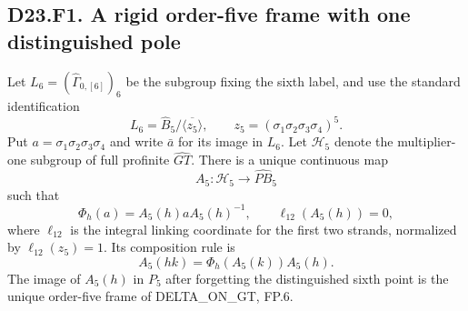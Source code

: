 
\subsection*{D23.F1. A rigid order-five frame with one distinguished pole}
Let $L_6=(\widehat\Gamma_{0,[6]})_6$ be the subgroup fixing the
sixth label, and use the standard identification
\[
 L_6=\widehat B_5/\overline{\langle z_5\rangle},\qquad
 z_5=(\sigma_1\sigma_2\sigma_3\sigma_4)^5.
\]
Put $a=\sigma_1\sigma_2\sigma_3\sigma_4$ and write $\bar a$
for its image in $L_6$.  Let $\mathcal H_5$ denote the
multiplier-one subgroup of full profinite $\widehat{GT}$.
There is a unique continuous map
\[
 A_5:\mathcal H_5\longrightarrow\widehat{PB}_5
\]
such that
\[
 \Phi_h(a)=A_5(h)aA_5(h)^{-1},\qquad
 \ell_{12}(A_5(h))=0,
 \tag{D23.F1.1}
\]
where $\ell_{12}$ is the integral linking coordinate for the first
two strands, normalized by $\ell_{12}(z_5)=1$.
Its composition rule is
\[
 A_5(hk)=\Phi_h(A_5(k))A_5(h).
 \tag{D23.F1.2}
\]
The image of $A_5(h)$ in $P_5$ after forgetting the distinguished
sixth point is the unique order-five frame of
DELTA\_ON\_GT, FP.6.

